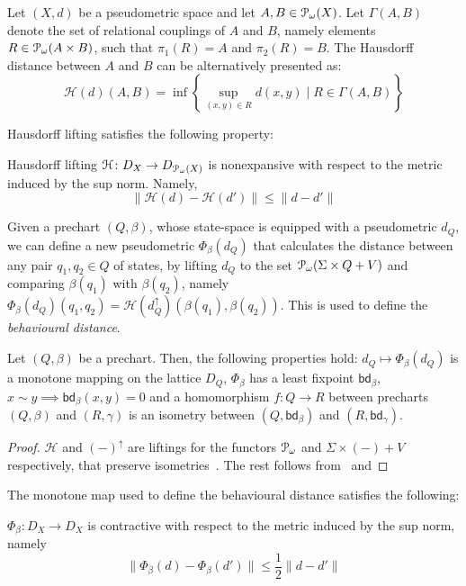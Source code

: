 \begin{remark}\label{rem:hausdorff_duality}
Let $(X, d)$ be a pseudometric space and let $A, B \in \mathcal{P}_\omega(X)$. Let $\Gamma(A,B)$ denote the set of relational couplings of $A$ and $B$, namely elements $R \in \mathcal{P}_\omega(A \times B)$, such that $\pi_1 (R)=A$ and $\pi_2(R)=B$. The Hausdorff distance between $A$ and $B$ can be alternatively presented as:
$$
	\mathcal{H}(d)(A,B) = \inf \left\{\sup_{(x,y) \in R} d(x,y) \mid R \in \Gamma(A,B) \right\}
$$
\end{remark}
Hausdorff lifting satisfies the following property:
\begin{lemma}
	Hausdorff lifting $\mathcal{H} \colon D_X \to D_{\mathcal{P}_\omega(X)}$ is nonexpansive with respect to the metric induced by the sup norm. Namely,
	$$\|\mathcal{H}(d) - \mathcal{H}(d')\| \leq \|d - d' \|$$ 
\end{lemma}
Given a prechart $(Q, \beta)$, whose state-space is equipped with a pseudometric $d_Q$, we can define a new pseudometric $\Phi_{\beta}(d_Q)$ that calculates the distance between any pair $q_1, q_2 \in Q$ of states, by lifting $d_Q$ to the set $\mathcal{P}_\omega(\Sigma \times Q + V)$ and comparing $\beta(q_1)$ with $\beta(q_2)$, namely 
	$
		\Phi_\beta(d_Q)(q_1,q_2) = \mathcal{H}\left(d_Q^\uparrow\right) (\beta(q_1), \beta(q_2))
	$. This is used to define the \emph{behavioural distance}.
	\begin{theorem}\label{thm:beh_dist}
		Let $(Q, \beta)$ be a prechart. Then, the following properties hold:  $d_Q \mapsto \Phi_\beta(d_Q)$ is a monotone mapping on the lattice $D_Q$,  $\Phi_\beta$ has a least fixpoint $\mathsf{bd}_\beta$,  $x \sim y \implies \mathsf{bd}_\beta(x,y) = 0$ and  a homomorphism $f \colon Q \to R$ between precharts $(Q, \beta)$ and $(R, \gamma)$ is an isometry between $(Q, \mathsf{bd}_\beta)$ and $(R, \mathsf{bd}_\gamma)$.
	\end{theorem}
	\begin{proof}
		$\mathcal{H}$ and $(-)^\uparrow$ are liftings for the functors $\mathcal{P}_\omega$ and $\Sigma \times (-) + V$ respectively, that preserve isometries~\cite[Theorem~5.8]{Baldan:2018:Coalgebraic}. The rest follows from~ and 
	\end{proof}
	The monotone map used to define the behavioural distance satisfies the following:
\begin{lemma}
	$\Phi_\beta \colon D_X \to D_X$ is contractive with respect to the metric induced by the sup norm, namely
	$$
	\|\Phi_\beta(d)-\Phi_\beta(d')\| \leq \frac{1}{2}\|d-d'\|
	$$
\end{lemma}
